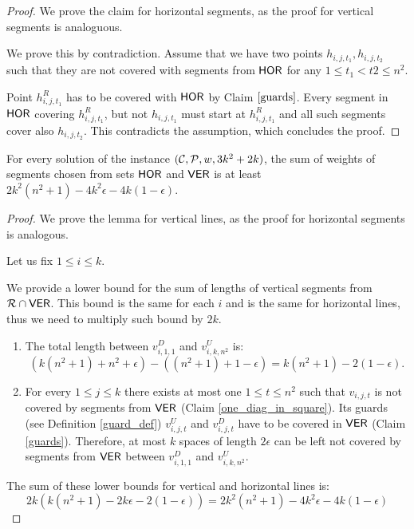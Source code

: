 {{{{\begin{proof}
We prove the claim for horizontal segments,
as the proof for vertical segments is analoguous.

We prove this by contradiction. Assume that we
have two points $h_{i,j,t_1}, h_{i,j,t_2}$
such that they are not covered with segments from $\mathsf{HOR}$
for any $1 \le t_1 < t2 \le n^2$.

Point $h^R_{i, j, t_1}$ has to be covered with $\mathsf{HOR}$
by Claim $\ref{guards}$.
Every segment in $\mathsf{HOR}$ covering $h^R_{i, j, t_1}$,
but not $h_{i,j,t_1}$ must start at $h^R_{i, j, t_1}$
and all such segments cover also $h_{i, j, t_2}$.
This contradicts the assumption, which concludes the proof.
\end{proof}

\begin{lemma}
\label{vertical_horizontal_sum}
For every solution of the instance $(\mathcal{C}, \mathcal{P}, w, 3k^2+2k)$,
the sum of weights of segments chosen
from sets $\mathsf{HOR}$ and $\mathsf{VER}$ is at least
$2k^2(n^2+1) -4k^2\epsilon -4k(1-\epsilon)$.
\end{lemma}

\begin{proof}
We prove the lemma for vertical lines,
as the proof for horizontal segments is analogous.

Let us fix $1 \le i \le k$.

We provide a lower bound for the sum of lengths
of vertical segments from $\mathcal{R} \cap \mathsf{VER}$.
This bound is the same for each $i$ and is the same
for horizontal lines, thus we need to multiply such bound by $2k$.

\begin{enumerate}[label={(\arabic*)}]
\item The total length between $v^D_{i, 1, 1}$ and $v^U_{i, k, n^2}$ is:
$$(k(n^2+1) + n^2 +\epsilon) - ((n^2+1)+1 -\epsilon) = k(n^2+1) - 2(1 - \epsilon).$$

\item For every $1 \le j \le k$ there exists at most one $1 \le t \le n^2$
such that $v_{i,j,t}$ is not covered by segments from $\mathsf{VER}$
(Claim \ref{one_diag_in_square}).
Its guards (see Definition \ref{guard_def}) $v^U_{i,j,t}$ and $v^D_{i,j,t}$
have to be covered in $\mathsf{VER}$ (Claim \ref{guards}).
Therefore, at most $k$ spaces of length $2\epsilon$ can be left
not covered by segments from $\mathsf{VER}$ between $v_{i,1,1}^D$ and $v_{i,k,n^2}^U$.

\end{enumerate}
The sum of these lower bounds for vertical and horizontal lines is:
$$2k(k(n^2+1) -2k\epsilon -2(1-\epsilon)) = 2k^2(n^2+1) -4k^2\epsilon -4k(1-\epsilon)$$
\end{proof}

}}}}
